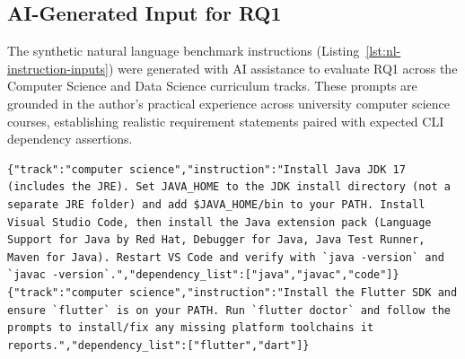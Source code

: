 \subsection{AI-Generated Input for RQ1}

The synthetic natural language benchmark instructions (Listing~\ref{lst:nl-instruction-inputs}) were generated with AI assistance to evaluate RQ1 across the Computer Science and Data Science curriculum tracks. These prompts are grounded in the author's practical experience across university computer science courses, establishing realistic requirement statements paired with expected CLI dependency assertions.

\begin{lstlisting}[caption={Natural Language Instruction Benchmark Inputs}, label={lst:nl-instruction-inputs}]
{"track":"computer science","instruction":"Install Java JDK 17 (includes the JRE). Set JAVA_HOME to the JDK install directory (not a separate JRE folder) and add $JAVA_HOME/bin to your PATH. Install Visual Studio Code, then install the Java extension pack (Language Support for Java by Red Hat, Debugger for Java, Java Test Runner, Maven for Java). Restart VS Code and verify with `java -version` and `javac -version`.","dependency_list":["java","javac","code"]}
{"track":"computer science","instruction":"Install the Flutter SDK and ensure `flutter` is on your PATH. Run `flutter doctor` and follow the prompts to install/fix any missing platform toolchains it reports.","dependency_list":["flutter","dart"]}


\end{lstlisting}
